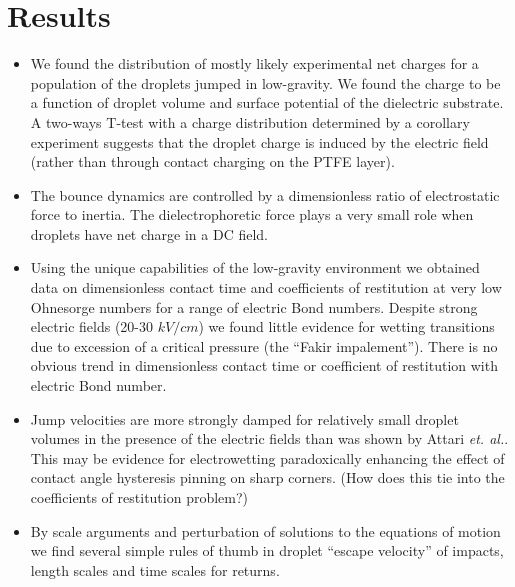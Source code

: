 \documentclass[a4paper, 12pt]{article}
\begin{document}
\section{Results}
\begin{itemize}
\item We found the distribution of mostly likely experimental net charges for a population of the droplets jumped in low-gravity. We found the charge to be a function of droplet volume and surface potential of the dielectric substrate. A two-ways T-test with a charge distribution determined by a corollary experiment suggests that the droplet charge is induced by the electric field (rather than through contact charging on the PTFE layer).

\item The bounce dynamics are controlled by a dimensionless ratio of electrostatic force to inertia. The dielectrophoretic force plays a very small role when droplets have net charge in a DC field.  

\item Using the unique capabilities of the low-gravity environment we obtained data on dimensionless contact time and coefficients of restitution at very low Ohnesorge numbers for a range of electric Bond numbers. Despite strong electric fields (20-30 $kV/cm$) we found little evidence for wetting transitions due to excession of a critical pressure (the ``Fakir impalement''). There is no obvious trend in dimensionless contact time or coefficient of restitution with electric Bond number.

\item Jump velocities are more strongly damped for relatively small droplet volumes in the presence of the electric fields than was shown by Attari \emph{et. al.}. This may be evidence for electrowetting paradoxically enhancing the effect of contact angle hysteresis pinning on sharp corners. (How does this tie into the coefficients of restitution problem?)

\item By scale arguments and perturbation of solutions to the equations of motion we find several simple rules of thumb in droplet ``escape velocity'' of impacts, length scales and time scales for returns.

\end{itemize} 
\end{document}
